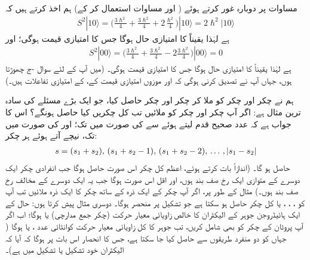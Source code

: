  مساوات  پر دوبارہ غور کرتے ہوئے ( اور مساوات  استعمال کر کے) ہم اخذ کرتے ہیں کہ 
\begin{align}\label{مساوات_تین_ابعاد_ایک_صفر_بعد_درکار}
S^2 | 1 0 \rangle = \big ( \frac{3\hslash^2}{4} + \frac{3\hslash^2}{4} +2 \frac{ \hslash^2}{4} \big ) | 1 0 \rangle =2\hslash^2 |1 0\rangle
\end{align}
ہے لہٰذا  یقیناً  کا امتیازی حال ہوگا جس کا امتیازی قیمت  ہوگی؛ اور 
\begin{align}
S^2 | 0 0 \rangle = \big ( \frac{3\hslash^2}{4} + \frac{3\hslash^2}{4} -2 \frac{3 \hslash^2}{4} \big ) | 0 0 \rangle =0
\end{align}
ہے لہٰذا  یقیناً  کا امتیازی حال ہوگا جس کا امتیازی قیمت  ہوگی۔ (میں آپ کے لئے سوال -ج چھوڑتا ہوں، جہاں آپ نے تصدیق کرنی ہوگی کہ  اور موزوں امتیازی قیمت کے،  کے امتیازی تفاعلات ہیں۔)

 ہم نے  چکر اور  چکر کو ملا کر  چکر اور  چکر حاصل کیا، جو ایک بڑے مسئلے کی سادہ ترین مثال ہے: اگر آپ  چکر اور  چکر کو ملائیں تب کل چکریں  کیا حاصل ہونگے؟  اس کا جواب ہے کہ عدد صحیح قدم لیتے ہوئے  سے  کی صورت میں  تک؛ اور  کی صورت میں  تک، نیچے آتے ہوئے ہر چکر: 
\begin{align}
s=(s_1+s_2), \,(s_1+s_2-1),\, (s_1+s_2-2), \,\dotsc \, , \,\abs{s_1-s_2}
\end{align}
حاصل ہو گا۔ (اندازاً بات کرتے ہوئے، اعظم کل چکر اس صورت حاصل ہوگا جب انفرادی چکر ایک دوسرے کے متوازی ایک رخ صف بند ہوں، اور اقل اس صورت ہوگا جب یہ ایک دوسرے کے مخالف رخ صف بند ہوں۔) مثال کے طور پر، اگر آپ  چکر کے ایک ذرہ کے ساتھ  چکر کا ایک ذرہ ملائیں تب آپ کو ، ، ، یا  کل چکر حاصل ہو سکتا ہے جو تشکیل پر منحصر ہوگا۔ دوسری مثال پیش کرتا ہوں: حال  کے ایک ہائیڈروجن جوہر کے الیکٹران کا خالص زاویائی معیار حرکت (چکر
 جمع مدارچی)  یا  ہوگا؛ اب اگر آپ پروٹان کے چکر کو بھی شامل کریں، تب جوہر کا کل زاویائی معیار حرکت کوانٹائی عدد ،  یا  ہوگا ( جہاں  کو دو منفرد طریقوں سے حاصل کیا جا سکتا ہے، جس کا انحصار اس بات پر ہوگا کہ آیا کہ الیکٹران خود  تشکیل یا  تشکیل میں ہے)۔


